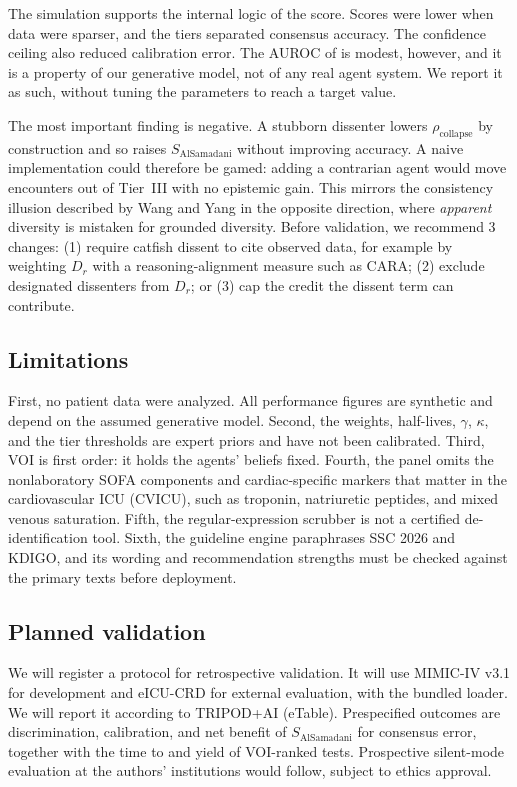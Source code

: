 \documentclass[11pt]{article}
\newcommand{\Sal}{S_{\mathrm{AlSamadani}}}
\begin{document}
The simulation supports the internal logic of the score. Scores were lower when data were sparser, and the tiers
separated consensus accuracy. The confidence ceiling also reduced calibration error. The AUROC of \MCAUROC{} is modest,
however, and it is a property of our generative model, not of any real agent system. We report it as such, without
tuning the parameters to reach a target value.

The most important finding is negative. A stubborn dissenter lowers $\rho_{\mathrm{collapse}}$ by construction and so
raises $\Sal$ without improving accuracy. A naive implementation could therefore be gamed: adding a contrarian agent
would move encounters out of Tier~III with no epistemic gain. This mirrors the consistency illusion described by Wang
and Yang\cite{wangyang} in the opposite direction, where \emph{apparent} diversity is mistaken for grounded diversity.
Before validation, we recommend 3 changes: (1) require catfish dissent to cite observed data, for example by weighting
$D_r$ with a reasoning-alignment measure such as CARA;\cite{wangyang} (2) exclude designated dissenters from $D_r$; or
(3) cap the credit the dissent term can contribute.

\subsection{Limitations}
First, no patient data were analyzed. All performance figures are synthetic and depend on the assumed generative model.
Second, the weights, half-lives, $\gamma$, $\kappa$, and the tier thresholds are expert priors and have not been
calibrated. Third, VOI is first order: it holds the agents' beliefs fixed. Fourth, the panel omits the nonlaboratory
SOFA components and cardiac-specific markers that matter in the cardiovascular ICU (CVICU), such as troponin,
natriuretic peptides, and mixed venous saturation. Fifth, the regular-expression scrubber is not a certified
de-identification tool. Sixth, the guideline engine paraphrases SSC 2026 and KDIGO, and its wording and recommendation
strengths must be checked against the primary texts before deployment.

\subsection{Planned validation}
We will register a protocol for retrospective validation. It will use MIMIC-IV v3.1 for development and eICU-CRD for
external evaluation, with the bundled loader. We will report it according to TRIPOD+AI\cite{tripodai} (eTable).
Prespecified outcomes are discrimination, calibration, and net benefit of $\Sal$ for consensus error, together with the
time to and yield of VOI-ranked tests. Prospective silent-mode evaluation at the authors' institutions would follow,
subject to ethics approval.
\end{document}
